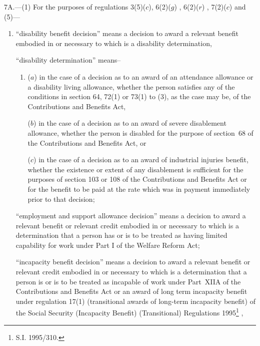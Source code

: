 \documentclass[12pt,a4paper]{article}
\begin{document}
7A.---(1)  For the purposes of regulations 3(5)($c$), 6(2)($g$)%
, 6(2)($r$)%
, 7(2)($c$) and (5)---  %
\begin{enumerate}\item[]
“disability benefit decision” means a decision to award a relevant benefit embodied in or necessary to which is a disability determination,

“disability determination” means–
\begin{enumerate}\item[]
($a$)
in the case of a decision as to an award of an attendance allowance or a disability living allowance, whether the person satisfies any of the conditions in section 64, 72(1) or 73(1) to (3), as the case may be, of the Contributions and Benefits Act,

($b$)
in the case of a decision as to an award of severe disablement allowance, whether the person is disabled for the purpose of section~68 of the Contributions and Benefits Act, or

($c$)
in the case of a decision as to an award of industrial injuries benefit, whether the existence or extent of any disablement is sufficient for the purposes of section 103 or 108 of the Contributions and Benefits Act or for the benefit to be paid at the rate which was in payment immediately prior to that decision;
\end{enumerate}

“employment and support allowance decision” means a decision to award a relevant benefit or relevant credit embodied in or necessary to which is a determination that a person has or is to be treated as having limited capability for work under Part I of the Welfare Reform Act;

“incapacity benefit decision” means a decision to award a relevant benefit 
or relevant credit  %
embodied in or necessary to which is a determination that a person is or is to be treated as incapable of work under Part~XIIA of the Contributions and Benefits Act
or an award of long term incapacity benefit under regulation 17(1) (transitional awards of long-term incapacity benefit) of the Social Security (Incapacity Benefit) (Transitional) Regulations 1995\footnote{S.I. 1995/310.}%
,


\end{enumerate}
\end{document}
